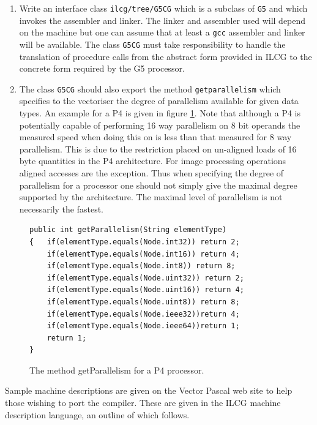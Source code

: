 {{\begin{enumerate}
\begin{enumerate}
\item \texttt{java ilcg.ILCG cpus/G5.ilc ilcg/tree/G5.java G5}
\end{enumerate}
\item Write an interface class \texttt{ilcg/tree/G5CG} which is a subclass
of \texttt{G5}  and which invokes the assembler and linker. The linker
and assembler used will depend on the machine but one can assume that
at least a \texttt{gcc} assembler and linker will be available. The
class \texttt{G5CG} must take responsibility to handle the translation
of procedure calls from the abstract form provided in ILCG to the
concrete form required by the G5 processor. 
\item The class \texttt{G5CG} should also export the method \texttt{getparallelism}
which specifies to the vectoriser the degree of parallelism available
for given data types. An example for a P4 is given in figure \ref{getparallelism}.
Note that although a P4 is potentially capable of performing 16 way
parallelism on 8 bit operands the measured speed when doing this on
is less than that measured for 8 way parallelism. This is due to the
restriction placed on un-aligned loads of 16 byte quantities in the
P4 architecture. For image processing operations aligned accesses
are the exception. Thus when specifying the degree of parallelism
for a processor one should not simply give the maximal degree supported
by the architecture. The maximal level of parallelism is not necessarily
the fastest. 
\end{enumerate}
%
\begin{figure}
\begin{verbatim}
public int getParallelism(String elementType) 
{   if(elementType.equals(Node.int32)) return 2;
    if(elementType.equals(Node.int16)) return 4;
    if(elementType.equals(Node.int8)) return 8;   
    if(elementType.equals(Node.uint32)) return 2;
    if(elementType.equals(Node.uint16)) return 4;
    if(elementType.equals(Node.uint8)) return 8;  
    if(elementType.equals(Node.ieee32))return 4; 
    if(elementType.equals(Node.ieee64))return 1;  
    return 1; 
} 
\end{verbatim}


\caption{The method getParallelism for a P4 processor. }

\label{getparallelism}
\end{figure}
 Sample machine descriptions   are given on the Vector Pascal
web site
  to help those wishing to port the compiler.
These are given in the ILCG machine description language, an outline
of which follows.


}}
